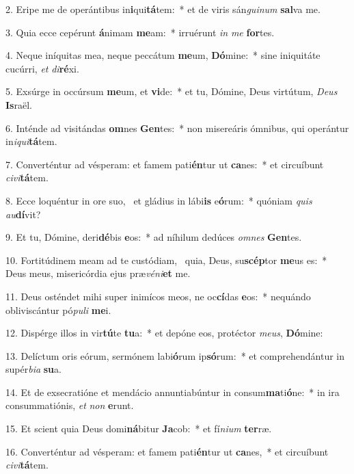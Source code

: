 2. Eripe me de operántibus in\textbf{i}qui\textbf{tá}tem:~*  et de viris sán\textit{gui}\textit{num} \textbf{sal}va me.\

3. Quia ecce cepérunt \textbf{á}nimam \textbf{me}am:~*  irruérunt \textit{in} \textit{me} \textbf{for}tes.\

4. Neque iníquitas mea, neque peccátum \textbf{me}um, \textbf{Dó}mine:~*  sine iniquitáte cucúrri, \textit{et} \textit{di}\textbf{ré}xi.\

5. Exsúrge in occúrsum \textbf{me}um, et \textbf{vi}de:~*  et tu, Dómine, Deus virtútum, \textit{De}\textit{us} \textbf{Is}raël.\

6. Inténde ad visitándas \textbf{om}nes \textbf{Gen}tes:~*  non misereáris ómnibus, qui operántur in\textit{i}\textit{qui}\textbf{tá}tem.\

7. Converténtur ad vésperam: et famem pati\textbf{én}tur ut \textbf{ca}nes:~*  et circuíbunt \textit{ci}\textit{vi}\textbf{tá}tem.\

8. Ecce loquéntur in ore suo, \dag\  et gládius in lábi\textbf{is} e\textbf{ó}rum:~*  quóniam \textit{quis} \textit{au}\textbf{dí}vit?\

9. Et tu, Dómine, deri\textbf{dé}bis \textbf{e}os:~*  ad níhilum dedúces \textit{om}\textit{nes} \textbf{Gen}tes.\

10. Fortitúdinem meam ad te custódiam, \dag\  quia, Deus, su\textbf{scép}tor \textbf{me}us es:~*  Deus meus, misericórdia ejus præ\textit{vé}\textit{ni}\textbf{et} me.\

11. Deus osténdet mihi super inimícos meos, ne oc\textbf{cí}das \textbf{e}os:~*  nequándo obliviscántur pó\textit{pu}\textit{li} \textbf{me}i.\

12. Dispérge illos in vir\textbf{tú}te \textbf{tu}a:~*  et depóne eos, protéctor \textit{me}\textit{us}, \textbf{Dó}mine:\

13. Delíctum oris eórum, sermónem labi\textbf{ó}rum ip\textbf{só}rum:~*  et comprehendántur in supér\textit{bi}\textit{a} \textbf{su}a.\

14. Et de exsecratióne et mendácio annuntiabúntur in consum\textbf{ma}ti\textbf{ó}ne:~*  in ira consummatiónis, \textit{et} \textit{non} \textbf{e}runt.\

15. Et scient quia Deus domi\textbf{ná}bitur \textbf{Ja}cob:~*  et fí\textit{ni}\textit{um} \textbf{ter}ræ.\

16. Converténtur ad vésperam: et famem pati\textbf{én}tur ut \textbf{ca}nes,~*  et circuíbunt \textit{ci}\textit{vi}\textbf{tá}tem.\

